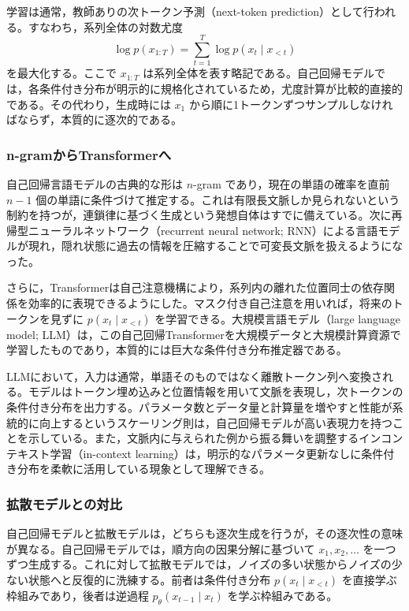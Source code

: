 学習は通常，教師ありの次トークン予測（next-token prediction）として行われる。すなわち，系列全体の対数尤度
\[
\log p(x_{1:T})
=
\sum_{t=1}^{T}\log p(x_t \mid x_{<t})
\]
を最大化する。ここで \(x_{1:T}\) は系列全体を表す略記である。自己回帰モデルでは，各条件付き分布が明示的に規格化されているため，尤度計算が比較的直接的である。その代わり，生成時には \(x_1\) から順に1トークンずつサンプルしなければならず，本質的に逐次的である。

\subsubsection{n-gramからTransformerへ}

自己回帰言語モデルの古典的な形は \(n\)-gram であり，現在の単語の確率を直前 \(n-1\) 個の単語に条件づけて推定する。これは有限長文脈しか見られないという制約を持つが，連鎖律に基づく生成という発想自体はすでに備えている。次に再帰型ニューラルネットワーク（recurrent neural network; RNN）による言語モデルが現れ，隠れ状態に過去の情報を圧縮することで可変長文脈を扱えるようになった。

さらに，Transformerは自己注意機構により，系列内の離れた位置同士の依存関係を効率的に表現できるようにした。マスク付き自己注意を用いれば，将来のトークンを見ずに \(p(x_t \mid x_{<t})\) を学習できる。大規模言語モデル（large language model; LLM）は，この自己回帰Transformerを大規模データと大規模計算資源で学習したものであり，本質的には巨大な条件付き分布推定器である。

LLMにおいて，入力は通常，単語そのものではなく離散トークン列へ変換される。モデルはトークン埋め込みと位置情報を用いて文脈を表現し，次トークンの条件付き分布を出力する。パラメータ数とデータ量と計算量を増やすと性能が系統的に向上するというスケーリング則は，自己回帰モデルが高い表現力を持つことを示している。また，文脈内に与えられた例から振る舞いを調整するインコンテキスト学習（in-context learning）は，明示的なパラメータ更新なしに条件付き分布を柔軟に活用している現象として理解できる。

\subsubsection{拡散モデルとの対比}

自己回帰モデルと拡散モデルは，どちらも逐次生成を行うが，その逐次性の意味が異なる。自己回帰モデルでは，順方向の因果分解に基づいて \(x_1,x_2,\dots\) を一つずつ生成する。これに対して拡散モデルでは，ノイズの多い状態からノイズの少ない状態へと反復的に洗練する。前者は条件付き分布 \(p(x_t \mid x_{<t})\) を直接学ぶ枠組みであり，後者は逆過程 \(p_{\theta}(x_{t-1}\mid x_t)\) を学ぶ枠組みである。

